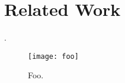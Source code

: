 \section{Related Work}
\label{sec:related_work}

\cite{tas, ros}. 

\begin{figure}[!h]

\texttt{[image: foo]} 
\caption{Foo.}
\label{fig:foo}

\end{figure}

\lipsum[1-4]

